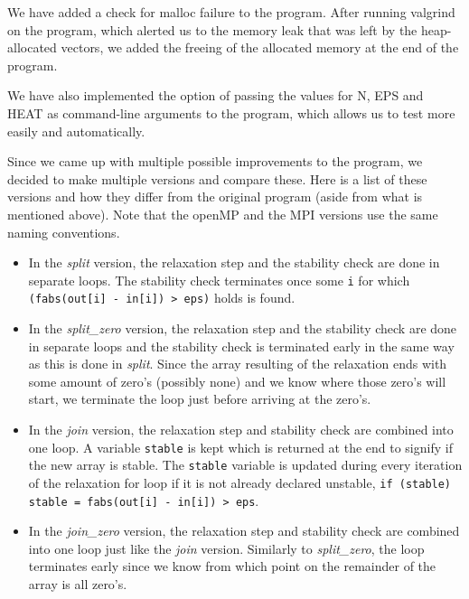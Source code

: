 \documentclass[a4paper]{article}
\begin{document}
\noindent We have added a check for malloc failure to the program. After running valgrind on the program, which alerted us to the memory leak that was left by the heap-allocated vectors, we added the freeing of the allocated memory at the end of the program. 

We have also implemented the option of passing the values for N, EPS and HEAT as command-line arguments to the program, which allows us to test more easily and automatically.

Since we came up with multiple possible improvements to the program, we decided to make multiple versions and compare these. Here is a list of these versions and how they differ from the original program (aside from what is mentioned above). Note that the openMP and the MPI versions use the same naming conventions.
\begin{itemize}
    \item
        In the \textit{split} version, the relaxation step and the stability check are done in separate loops. The stability check terminates once some \texttt{i} for which \texttt{(fabs(out[i] - in[i]) > eps)} holds is found.
    \item
        In the \textit{split\_zero} version, the relaxation step and the stability check are done in separate loops and the stability check is terminated early in the same way as this is done in \textit{split}. Since the array resulting of the relaxation ends with some amount of zero's (possibly none) and we know where those zero's will start, we terminate the loop just before arriving at the zero's.
    \item
        In the \textit{join} version, the relaxation step and stability check are combined into one loop. A variable \texttt{stable} is kept which is returned at the end to signify if the new array is stable. The \texttt{stable} variable is updated during every iteration of the relaxation for loop if it is not already declared unstable, \texttt{if (stable) stable = fabs(out[i] - in[i]) > eps}.
    \item
        In the \textit{join\_zero} version, the relaxation step and stability check are combined into one loop just like the \textit{join} version. Similarly to \textit{split\_zero}, the loop terminates early since we know from which point on the remainder of the array is all zero's.
\end{itemize}

\end{document}
